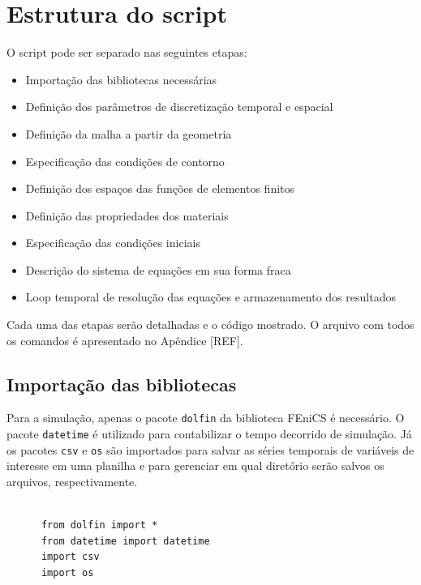     \section{Estrutura do script}\label{mat:script}
    O script pode ser separado nas seguintes etapas:

    \begin{itemize}
    \item Importação das bibliotecas necessárias
    \item Definição dos parâmetros de discretização temporal e espacial
    \item Definição da malha a partir da geometria
    \item Especificação das condições de contorno
    \item Definição dos espaços das funções de elementos finitos
    \item Definição das propriedades dos materiais
    \item Especificação das condições iniciais
    \item Descrição do sistema de equações em sua forma fraca
    \item Loop temporal de resolução das equações e armazenamento dos resultados 
    \end{itemize}

    Cada uma das etapas serão detalhadas e o código mostrado. O arquivo com
    todos os comandos é apresentado no Apêndice [REF].

    
    \subsection{Importação das bibliotecas}
    Para a simulação, apenas o pacote \texttt{dolfin} da biblioteca
    FEniCS é necessário. O pacote \texttt{datetime} é utilizado para
    contabilizar o tempo decorrido de simulação. Já os pacotes
    \texttt{csv} e \texttt{os} são importados para
    salvar as séries temporais de variáveis de interesse em uma planilha e para 
    gerenciar em qual diretório serão salvos os arquivos, respectivamente.

    \begin{verbatim}

      from dolfin import *
      from datetime import datetime
      import csv
      import os
    \end{verbatim}
   
